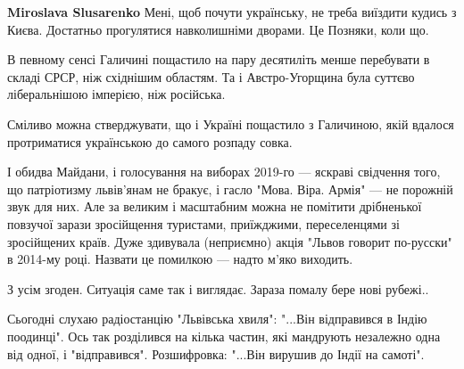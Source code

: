 \begin{itemize}
\begin{itemize}
\textbf{Miroslava Slusarenko} Мені, щоб почути українську, не треба виїздити кудись з Києва. Достатньо прогулятися навколишніми дворами. Це Позняки, коли що.
\end{itemize}

 

В певному сенсі Галичині пощастило на пару десятиліть менше перебувати в складі
СРСР, ніж східнішим областям. Та і Австро-Угорщина була суттєво ліберальнішою
імперією, ніж російська.

Сміливо можна стверджувати, що і Україні пощастило з Галичиною, якій вдалося
протриматися українською до самого розпаду совка.

І обидва Майдани, і голосування на виборах 2019-го — яскраві свідчення того, що
патріотизму львів'янам не бракує, і гасло "Мова. Віра. Армія" — не порожній
звук для них. Але за великим і масштабним можна не помітити дрібненької
повзучої зарази зросійщення туристами, приїжджими, переселенцями зі зросійщених
країв. Дуже здивувала (неприємно) акція "Львов говорит по-русски" в 2014-му
році. Назвати це помилкою — надто м'яко виходить.

\begin{itemize}
 
З усім згоден. Ситуація саме так і виглядає. Зараза помалу бере нові рубежі..
\end{itemize}

 

Сьогодні слухаю радіостанцію "Львівська хвиля": "...Він відправився в Індію
поодинці". Ось так розділився на кілька частин, які мандрують незалежно одна
від одної, і "відправився". Розшифровка: "...Він вирушив до Індії на самоті".


 


\end{itemize}

